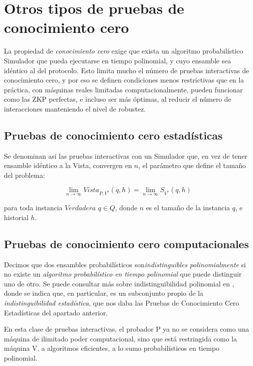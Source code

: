 \section{Otros tipos de pruebas de conocimiento cero}

La propiedad de \textit{conocimiento cero} exige que exista un algoritmo probabilístico Simulador que pueda ejecutarse en tiempo polinomial, y cuyo ensamble sea idéntico al del protocolo. Esto limita mucho el número de pruebas interactivas de conocimiento cero, y por eso se definen condiciones menos restrictivas que en la práctica, con máquinas reales limitadas computacionalmente, pueden funcionar como las ZKP perfectas, e incluso ser más óptimas, al reducir el número de interacciones manteniendo el nivel de robustez.

\hfil

\subsection{Pruebas de conocimiento cero estadísticas}

\hfil

Se denominan así las pruebas interactivas con un Simulador que, en vez de tener ensamble idéntico a la Vista, convergen en $n$, el parámetro que define el tamaño del problema:
\begin{center}
	$$
	\lim_{n\to\infty} Vista_{P,V^*}(q,h) =  \lim_{n\to\infty} S_{V^*}(q,h)
	$$
\end{center}

para toda instancia $Verdadera$ $q\in Q$, donde $n$ es el tamaño de la instancia $q$, e historial $h$. 

\hfil

\subsection{Pruebas de conocimiento cero computacionales}

\hfil

Decimos que dos ensambles probabilísticos son\textit{indistinguibles polinomialmente} si no existe un \textit{algoritmo probabilístico en tiempo polinomial} que puede distinguir uno de otro. Se puede consultar más sobre indistinguibilidad polinomial en \citep{book:856771}, donde se indica que, en particular, es un subconjunto propio de la \textit{indistinguibilidad estadística}, que nos daba las Pruebas de Conocimiento Cero Estadísticas del apartado anterior.

En esta clase de pruebas interactivas, el probador P ya no se considera como una máquina de ilimitado poder computacional, sino que está restringida como la máquina V, a algoritmos eficientes, a lo sumo probabilísticos en tiempo polinomial.

